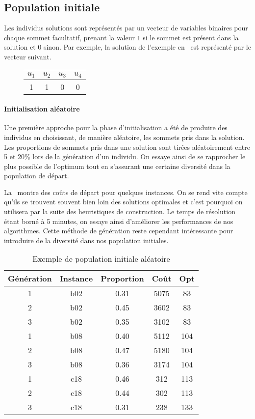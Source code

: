 \documentclass[10pt]{article}
\begin{document}
	\subsection{Population initiale}
		Les individus solutions sont représentés par un vecteur de variables binaires pour chaque sommet facultatif, prenant la valeur $1$ si le sommet est présent dans la solution et 0 sinon. Par exemple, la solution de l'exemple en~ est représenté par le vecteur suivant.
		\begin{figure}[h!]
			\centering
			\begin{tabular}{|c|c|c|c|}
				\hline
				$u_1$ & $u_2$ & $u_3$ & $u_4$ \\
				\hline
				1 & 1 & 0 & 0 \\
				\hline
			\end{tabular}
		\end{figure}
	
		\paragraph{Initialisation aléatoire}{
			Une première approche pour la phase d'initialisation a été de produire des individus en choisissant, de manière aléatoire, les sommets pris dans la solution. Les proportions de sommets pris dans une solution sont tirées aléatoirement entre 5 et 20\% lors de la génération d'un individu. On essaye ainsi de se rapprocher le plus possible de l'optimum tout en s'assurant une certaine diversité dans la population de départ.
			
			La~ montre des coûts de départ pour quelques instances. On se rend vite compte qu'ils se trouvent souvent bien loin des solutions optimales et c'est pourquoi on utilisera par la suite des heuristiques de construction. Le temps de résolution étant borné à 5 minutes, on essaye ainsi d'améliorer les performances de nos algorithmes. Cette méthode de génération reste cependant intéressante pour introduire de la diversité dans nos population initiales.
			
			\begin{table}[h!]
				\centering
				\begin{tabular}{|c|c|c|c|c|}
					\hline
					\textbf{Génération} & \textbf{Instance} & \textbf{Proportion} & \textbf{Coût} & \textbf{Opt} \\
					\hline
					1&b02  & 0.31 & 5075 & 83 \\
					2&b02  & 0.45 & 3602 & 83 \\
					3&b02  & 0.35 & 3102 & 83 \\
					1&b08  & 0.40 & 5112 & 104 \\
					2&b08  & 0.47 & 5180 & 104 \\
					3&b08  & 0.36 & 3174 & 104 \\
					1&c18  & 0.46 & 312 & 113 \\
					2&c18  & 0.44 & 302 & 113 \\
					3&c18  & 0.31 & 238 & 133 \\
					\hline
				\end{tabular}
				\caption{Exemple de population initiale aléatoire}
				\label{tab-randominit}
			\end{table}
			}
\end{document}
